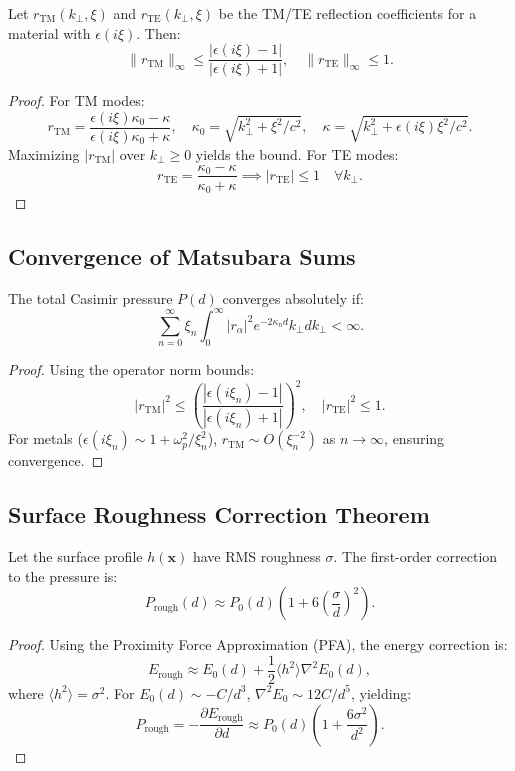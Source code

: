 \documentclass{article}
\begin{document}
\begin{theorem}
Let \(r_\text{TM}(k_{\perp}, \xi)\) and \(r_\text{TE}(k_{\perp}, \xi)\) be the TM/TE reflection coefficients for a material with \(\epsilon(i\xi)\). Then:
\[
\|r_\text{TM}\|_\infty \leq \frac{|\epsilon(i\xi) - 1|}{|\epsilon(i\xi) + 1|}, \quad \|r_\text{TE}\|_\infty \leq 1.
\]
\end{theorem}

\begin{proof}
For TM modes:
\[
r_\text{TM} = \frac{\epsilon(i\xi)\kappa_0 - \kappa}{\epsilon(i\xi)\kappa_0 + \kappa}, \quad \kappa_0 = \sqrt{k_{\perp}^2 + \xi^2/c^2}, \quad \kappa = \sqrt{k_{\perp}^2 + \epsilon(i\xi)\xi^2/c^2}.
\]
Maximizing \(|r_\text{TM}|\) over \(k_{\perp} \geq 0\) yields the bound. For TE modes:
\[
r_\text{TE} = \frac{\kappa_0 - \kappa}{\kappa_0 + \kappa} \implies |r_\text{TE}| \leq 1 \quad \forall k_{\perp}.
\]
\end{proof}

\subsection{Convergence of Matsubara Sums}
The total Casimir pressure \(P(d)\) converges absolutely if:
\[
\sum_{n=0}^\infty \xi_n \int_0^\infty |r_\alpha|^2 e^{-2\kappa_n d} k_{\perp} dk_{\perp} < \infty.
\]

\begin{proof}
Using the operator norm bounds:
\[
|r_\text{TM}|^2 \leq \left(\frac{|\epsilon(i\xi_n) - 1|}{|\epsilon(i\xi_n) + 1|}\right)^2, \quad |r_\text{TE}|^2 \leq 1.
\]
For metals (\(\epsilon(i\xi_n) \sim 1 + \omega_p^2/\xi_n^2\)), \(r_\text{TM} \sim O(\xi_n^{-2})\) as \(n \to \infty\), ensuring convergence.
\end{proof}

\subsection{Surface Roughness Correction Theorem}
Let the surface profile \(h(\mathbf{x})\) have RMS roughness \(\sigma\). The first-order correction to the pressure is:
\[
P_\text{rough}(d) \approx P_0(d) \left(1 + 6\left(\frac{\sigma}{d}\right)^2\right).
\]

\begin{proof}
Using the Proximity Force Approximation (PFA), the energy correction is:
\[
E_\text{rough} \approx E_0(d) + \frac{1}{2} \langle h^2 \rangle \nabla^2 E_0(d),
\]
where \(\langle h^2 \rangle = \sigma^2\). For \(E_0(d) \sim -C/d^3\), \(\nabla^2 E_0 \sim 12C/d^5\), yielding:
\[
P_\text{rough} = -\frac{\partial E_\text{rough}}{\partial d} \approx P_0(d) \left(1 + \frac{6\sigma^2}{d^2}\right).
\]
\end{proof}
\end{document}
